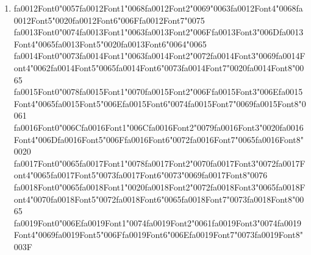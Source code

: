 \documentclass[12pt]{article}
\begin{document}
\begin{enumerate}[label=Q\arabic*.]
 \item {\csname fa0012Font0\endcsname\char"0057}{\csname fa0012Font1\endcsname\char"0068}{\csname fa0012Font2\endcsname\char"0069}{\char"0063}{\csname fa0012Font4\endcsname\char"0068}{\csname fa0012Font5\endcsname\char"0020}{\csname fa0012Font6\endcsname\char"006F}{\csname fa0012Font7\endcsname\char"0075} {\csname fa0013Font0\endcsname\char"0074}{\csname fa0013Font1\endcsname\char"0063}{\csname fa0013Font2\endcsname\char"006F}{\csname fa0013Font3\endcsname\char"006D}{\csname fa0013Font4\endcsname\char"0065}{\csname fa0013Font5\endcsname\char"0020}{\csname fa0013Font6\endcsname\char"0064}{\char"0065} {\csname fa0014Font0\endcsname\char"0073}{\csname fa0014Font1\endcsname\char"0063}{\csname fa0014Font2\endcsname\char"0072}{\csname fa0014Font3\endcsname\char"0069}{\csname fa0014Font4\endcsname\char"0062}{\csname fa0014Font5\endcsname\char"0065}{\csname fa0014Font6\endcsname\char"0073}{\csname fa0014Font7\endcsname\char"0020}{\csname fa0014Font8\endcsname\char"0065} {\csname fa0015Font0\endcsname\char"0078}{\csname fa0015Font1\endcsname\char"0070}{\csname fa0015Font2\endcsname\char"006F}{\csname fa0015Font3\endcsname\char"006E}{\csname fa0015Font4\endcsname\char"0065}{\csname fa0015Font5\endcsname\char"006E}{\csname fa0015Font6\endcsname\char"0074}{\csname fa0015Font7\endcsname\char"0069}{\csname fa0015Font8\endcsname\char"0061} {\csname fa0016Font0\endcsname\char"006C}{\csname fa0016Font1\endcsname\char"006C}{\csname fa0016Font2\endcsname\char"0079}{\csname fa0016Font3\endcsname\char"0020}{\csname fa0016Font4\endcsname\char"006D}{\csname fa0016Font5\endcsname\char"006F}{\csname fa0016Font6\endcsname\char"0072}{\csname fa0016Font7\endcsname\char"0065}{\csname fa0016Font8\endcsname\char"0020} {\csname fa0017Font0\endcsname\char"0065}{\csname fa0017Font1\endcsname\char"0078}{\csname fa0017Font2\endcsname\char"0070}{\csname fa0017Font3\endcsname\char"0072}{\csname fa0017Font4\endcsname\char"0065}{\csname fa0017Font5\endcsname\char"0073}{\csname fa0017Font6\endcsname\char"0073}{\char"0069}{\csname fa0017Font8\endcsname\char"0076} {\csname fa0018Font0\endcsname\char"0065}{\csname fa0018Font1\endcsname\char"0020}{\csname fa0018Font2\endcsname\char"0072}{\csname fa0018Font3\endcsname\char"0065}{\csname fa0018Font4\endcsname\char"0070}{\csname fa0018Font5\endcsname\char"0072}{\csname fa0018Font6\endcsname\char"0065}{\csname fa0018Font7\endcsname\char"0073}{\csname fa0018Font8\endcsname\char"0065} {\csname fa0019Font0\endcsname\char"006E}{\csname fa0019Font1\endcsname\char"0074}{\csname fa0019Font2\endcsname\char"0061}{\csname fa0019Font3\endcsname\char"0074}{\csname fa0019Font4\endcsname\char"0069}{\csname fa0019Font5\endcsname\char"006F}{\csname fa0019Font6\endcsname\char"006E}{\csname fa0019Font7\endcsname\char"0073}{\csname fa0019Font8\endcsname\char"003F}

\end{enumerate}
\end{document}
